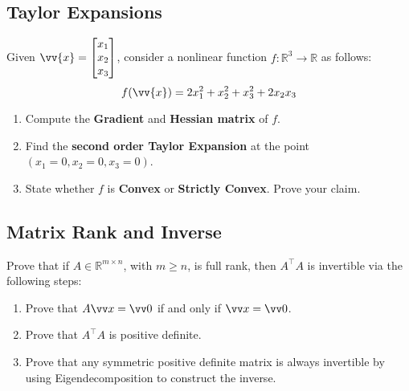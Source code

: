 \subsection{Taylor Expansions}
Given $\vv{x} = \begin{bmatrix} x_1 \\ x_2 \\ x_3\end{bmatrix}$, consider a nonlinear function $f: \mathbb{R}^3 \longrightarrow \mathbb{R}$ as follows:
\begin{equation}
    f(\vv{x}) = 2 x_1^2 + x_2^2 + x_3^2 + 2 x_2 x_3
\end{equation}
\begin{enumerate}
\item Compute the \textbf{Gradient} and \textbf{Hessian matrix} of $f$.

\item Find the \textbf{second order Taylor Expansion} at the point $(x_1 = 0, x_2 = 0, x_3 = 0)$.

\item State whether $f$ is \textbf{Convex} or \textbf{Strictly Convex}. Prove your claim.

\end{enumerate}

\subsection{Matrix Rank and Inverse}
Prove that if $A \in \mathbb{R}^{m \times n}$, with $m\ge n$, is full rank, then $A^\top A$ is invertible via the following steps:
\begin{enumerate}
    \item Prove that $A\vv x = \vv 0$ if and only if $\vv x = \vv 0$. 
    \item Prove that $A^\top A$ is positive definite.
    \item Prove that any symmetric positive definite matrix is always invertible by using Eigendecomposition to construct the inverse.
\end{enumerate}